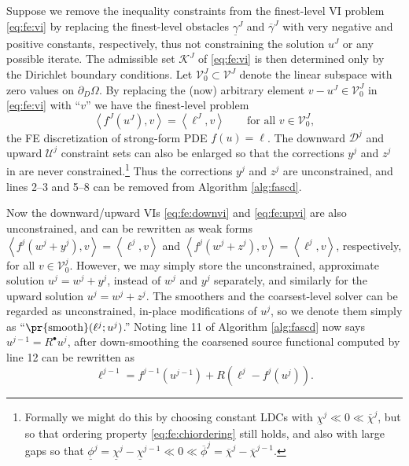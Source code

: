 \documentclass[letterpaper,final,12pt,reqno]{amsart}
\theoremstyle{cstyle}
\theoremstyle{cstyle*}
\theoremstyle{dstyle}
\numberwithin{equation}{section}
\numberwithin{figure}{section}
\numberwithin{table}{section}
\numberwithin{theorem}{section}
\newcommand{\ip}[2]{\left<#1,#2\right>}
\newcommand{\iR}{R^{\bullet}}
\begin{document}
Suppose we remove the inequality constraints from the finest-level VI problem \eqref{eq:fe:vi} by replacing the finest-level obstacles $\underline{\gamma}^J$ and $\overline{\gamma}^J$ with very negative and positive constants, respectively, thus not constraining the solution $u^J$ or any possible iterate.  The admissible set $\mathcal{K}^J$ of \eqref{eq:fe:vi} is then determined only by the Dirichlet boundary conditions.  Let $\mathcal{V}_0^J \subset \mathcal{V}^J$ denote the linear subspace with zero values on $\partial_D\Omega$.  By replacing the (now) arbitrary element $v-u^J\in\mathcal{V}_0^J$ in \eqref{eq:fe:vi} with ``$v$'' we have the finest-level problem
\begin{equation}
\ip{f^J(u^J)}{v} = \ip{\ell^J}{v} \qquad \text{for all } v\in \mathcal{V}_0^J, \label{eq:app:fas:pde}
\end{equation}
the FE discretization of strong-form PDE $f(u)=\ell$.  The downward $\mathcal{D}^j$ and upward $\mathcal{U}^j$ constraint sets can also be enlarged so that the corrections $y^j$ and $z^j$ in  are never constrained.\footnote{Formally we might do this by choosing constant LDCs with $\underline{\chi}^j \ll 0 \ll \overline{\chi}^j$, but so that ordering property \eqref{eq:fe:chiordering} still holds, and also with large gaps so that $\underline{\phi}^j = \underline{\chi}^j - \underline{\chi}^{j-1} \ll 0 \ll \overline{\phi}^j = \overline{\chi}^j - \overline{\chi}^{j-1}$.}  Thus the corrections $y^j$ and $z^j$ are unconstrained, and lines 2--3 and 5--8 can be removed from Algorithm \ref{alg:fascd}.

Now the downward/upward VIs \eqref{eq:fe:downvi} and \eqref{eq:fe:upvi} are also unconstrained, and can be rewritten as weak forms $\ip{f^j(w^j + y^j)}{v} = \ip{\ell^j}{v}$ and $\ip{f^j(w^j + z^j)}{v} = \ip{\ell^j}{v}$, respectively, for all $v\in \mathcal{V}_0^j$.  However, we may simply store the unconstrained, approximate solution $u^j=w^j+y^j$, instead of $w^j$ and $y^j$ separately, and similarly for the upward solution $u^j=w^j+z^j$.  The smoothers and the coarsest-level solver can be regarded as unconstrained, in-place modifications of $u^j$, so we denote them simply as ``$\text{\pr{smooth}}(\ell^j;u^j)$.''  Noting line 11 of Algorithm \ref{alg:fascd} now says $u^{j-1}=\iR u^j$, after down-smoothing the coarsened source functional computed by line 12 can be rewritten as
\begin{equation}
\ell^{j-1} = f^{j-1}\left(u^{j-1}\right) + R\left(\ell^j-f^j(u^j)\right). \label{eq:app:fas:levelsource}
\end{equation}
\end{document}
